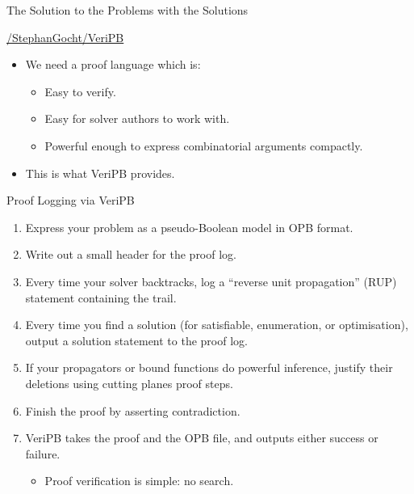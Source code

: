 \documentclass{beamer}
\begin{document}
\begin{frame}{The Solution to the Problems with the Solutions}
    \begin{center}
        \url{/StephanGocht/VeriPB}
    \end{center}
    \bigskip
    \begin{itemize}
        \item We need a proof language which is:
            \begin{itemize}
                \item Easy to verify.
                \item Easy for solver authors to work with.
                \item Powerful enough to express combinatorial arguments compactly.
            \end{itemize}
        \item This is what VeriPB provides.
    \end{itemize}
\end{frame}

\begin{frame}{Proof Logging via VeriPB}
    \begin{enumerate}
        \item Express your problem as a pseudo-Boolean model in OPB format.
        \item Write out a small header for the proof log.
        \item Every time your solver backtracks, log a ``reverse unit propagation'' (RUP)
            statement containing the trail.
        \item Every time you find a solution (for satisfiable, enumeration, or optimisation), output
            a solution statement to the proof log.
        \item If your propagators or bound functions do powerful inference, justify their deletions
            using cutting planes proof steps.
        \item Finish the proof by asserting contradiction.
        \item VeriPB takes the proof and the OPB file, and outputs either success or failure.
            \begin{itemize}
                \item Proof verification is simple: no search.
            \end{itemize}
    \end{enumerate}
\end{frame}
\end{document}
